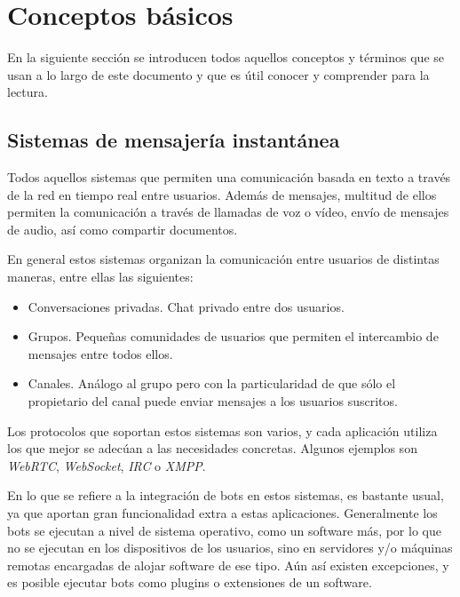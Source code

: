 \section{Conceptos básicos}

En la siguiente sección se introducen todos aquellos conceptos y términos que se usan a lo largo de este documento y que es útil conocer y comprender para la lectura.



\subsection{Sistemas de mensajería instantánea}

Todos aquellos sistemas que permiten una comunicación basada en texto a través de la red en tiempo real entre usuarios. Además de mensajes, multitud de ellos permiten la comunicación a través de llamadas de voz o vídeo, envío de mensajes de audio, así como compartir documentos.

En general estos sistemas organizan la comunicación entre usuarios de distintas maneras, entre ellas las siguientes:

\begin{itemize}
	\item Conversaciones privadas. Chat privado entre dos usuarios.
	\item Grupos. Pequeñas comunidades de usuarios que permiten el intercambio de mensajes entre todos ellos.
	\item Canales. Análogo al grupo pero con la particularidad de que sólo el propietario del canal puede enviar mensajes a los usuarios suscritos.
\end{itemize}

Los protocolos que soportan estos sistemas son varios, y cada aplicación utiliza los que mejor se adecúan a las necesidades concretas. Algunos ejemplos son \textit{WebRTC}, \textit{WebSocket}, \textit{IRC} o \textit{XMPP}.

En lo que se refiere a la integración de bots en estos sistemas, es bastante usual, ya que aportan gran funcionalidad extra a estas aplicaciones. Generalmente los bots se ejecutan a nivel de sistema operativo, como un software más, por lo que no se ejecutan en los dispositivos de los usuarios, sino en servidores y/o máquinas remotas encargadas de alojar software de ese tipo. Aún así existen excepciones, y es posible ejecutar bots como plugins o extensiones de un software.



